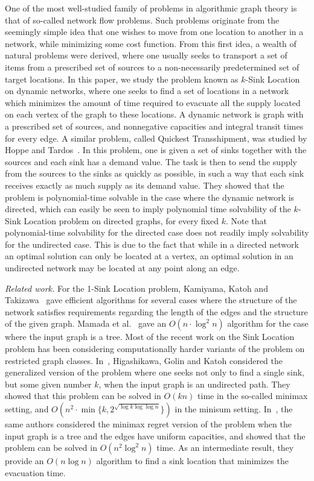 \documentclass[a4paper,10pt]{llncs}
\begin{document}
One of the most well-studied family of problems in algorithmic graph theory is that of so-called network flow problems. Such problems originate from the seemingly simple idea that one wishes to move from one location to another in a network, while minimizing some cost function. From this first idea, a wealth of natural problems were derived, where one usually seeks to transport a set of items from a prescribed set of sources to a non-necessarily predetermined set of target locations. In this paper, we study the problem known as $k$-{\sc Sink Location} on dynamic networks, where one seeks to find a set of locations in a network which minimizes the amount of time required to evacuate all the supply located on each vertex of the graph to these locations. A dynamic network is graph with a prescribed set of sources, and nonnegative capacities and integral transit times for every edge. A similar problem, called {\sc Quickest Transshipment}, was studied by Hoppe and Tardos~\cite{HT00}. In this problem, one is given a set of sinks together with the sources and each sink has a demand value. The task is then to send the supply from the sources to the sinks as quickly as possible, in such a way that each sink receives exactly as much supply as its demand value.  They showed that the problem is polynomial-time solvable in the case where the dynamic network is directed, which can easily be seen to imply polynomial time solvability of the $k$-{\sc Sink Location} problem on directed graphs, for every fixed $k$. Note that polynomial-time solvability for the directed case does not readily imply solvability for the undirected case. This is due to the fact that while in a directed network an optimal solution can only be located at a vertex, an optimal solution in an undirected network may be located at any point along an edge.

{\em Related work.} For the 1-{\sc Sink Location} problem, Kamiyama, Katoh and Takizawa~\cite{KKT06,KKT09} gave efficient algorithms for several cases where the structure of the network satisfies requirements regarding the length of the edges and the structure of the given graph. Mamada et al.~\cite{MUMF06} gave an $O(n\cdot \log^2{n})$ algorithm for the case where the input graph is a tree. Most of the recent work on the {\sc Sink Location} problem has been considering computationally harder variants of the problem on restricted graph classes. In~\cite{HGK14}, Higashikawa, Golin and Katoh considered the generalized version of the problem where one seeks not only to find a single sink, but some given number $k$, when the input graph is an undirected path. They showed that this problem can be solved in $O(kn)$ time in the so-called minimax setting, and $O(n^2 \cdot \min\{k,2^{\sqrt{\log{k} \log\log{n}}}\})$ in the minisum setting. In~\cite{HGK14a}, the same authors considered the minimax  regret version of the problem when the input graph is a tree and the edges have uniform capacities, and showed that the problem can be solved in $O(n^2 \log^2 n)$ time. As an intermediate result, they provide an $O(n \log n)$ algorithm to find a sink location that minimizes the evacuation time.
\end{document}
